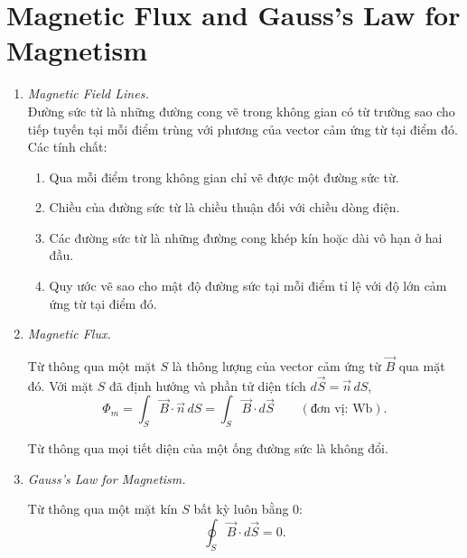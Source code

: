\section{Magnetic Flux and Gauss's Law for Magnetism}
\begin{enumerate}
\item \textit{Magnetic Field Lines.}\\
Đường sức từ là những đường cong vẽ trong không gian có từ trường sao cho tiếp tuyến tại mỗi điểm trùng với phương của vector cảm ứng từ tại điểm đó. Các tính chất:
\begin{enumerate}
  \item[(a)] Qua mỗi điểm trong không gian chỉ vẽ được một đường sức từ.
  \item[(b)] Chiều của đường sức từ là chiều thuận đối với chiều dòng điện.
  \item[(c)] Các đường sức từ là những đường cong khép kín hoặc dài vô hạn ở hai đầu.
  \item[(d)] Quy ước vẽ sao cho mật độ đường sức tại mỗi điểm tỉ lệ với độ lớn cảm ứng từ tại điểm đó.
\end{enumerate}

\item \textit{Magnetic Flux.}\\
\begin{definition}
Từ thông qua một mặt $S$ là thông lượng của vector cảm ứng từ $\vec{B}$ qua mặt đó. Với mặt $S$ đã định hướng và phần tử diện tích $d\vec{S} = \vec{n}\,dS$,
\[
\Phi_m = \int_S \vec{B}\cdot\vec{n}\,dS = \int_S \vec{B}\cdot d\vec{S} \qquad (\text{đơn vị: Wb}).
\]
\end{definition}
Từ thông qua mọi tiết diện của một ống đường sức là không đổi.

\item \textit{Gauss's Law for Magnetism.}\\
\begin{theorem}[Gauss]
Từ thông qua một mặt kín $S$ bất kỳ luôn bằng 0:
\[
\oint_S \vec{B}\cdot d\vec{S} = 0.
\]
\end{theorem}
\end{enumerate}

